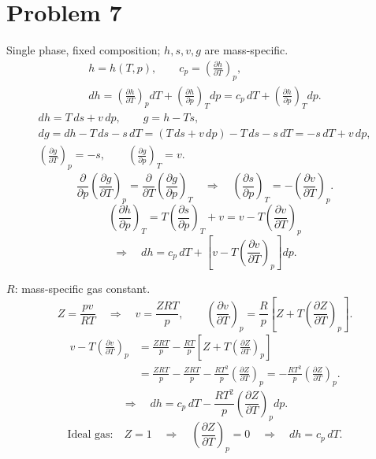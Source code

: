 \section*{Problem 7}

Single phase, fixed composition; $h,s,v,g$ are mass-specific.
\begin{gather*}
h=h(T,p),\qquad c_p=\left(\frac{\partial h}{\partial T}\right)_p,\\
dh=\left(\frac{\partial h}{\partial T}\right)_p dT
   +\left(\frac{\partial h}{\partial p}\right)_T dp
 =c_p\,dT+\left(\frac{\partial h}{\partial p}\right)_T dp.
\end{gather*}
\begin{gather*}
dh=T\,ds+v\,dp,\qquad g=h-Ts,\\
dg=dh-T\,ds-s\,dT
   =(T\,ds+v\,dp)-T\,ds-s\,dT=-s\,dT+v\,dp,\\
\left(\frac{\partial g}{\partial T}\right)_p=-s,\qquad
\left(\frac{\partial g}{\partial p}\right)_T=v.
\end{gather*}
\[
\frac{\partial}{\partial p}\left(\frac{\partial g}{\partial T}\right)_p
=\frac{\partial}{\partial T}\left(\frac{\partial g}{\partial p}\right)_T
\quad\Longrightarrow\quad
\left(\frac{\partial s}{\partial p}\right)_T
=-\left(\frac{\partial v}{\partial T}\right)_p.
\]
\[
\left(\frac{\partial h}{\partial p}\right)_T
=T\left(\frac{\partial s}{\partial p}\right)_T+v
=v-T\left(\frac{\partial v}{\partial T}\right)_p
\]
\[
\Longrightarrow\quad
\boxed{dh=c_p\,dT+
\left[v-T\left(\frac{\partial v}{\partial T}\right)_p\right]dp.}
\]

$R$: mass-specific gas constant.
\[
Z=\frac{pv}{RT}\quad\Longrightarrow\quad
v=\frac{ZRT}{p},\qquad
\left(\frac{\partial v}{\partial T}\right)_p
=\frac{R}{p}\left[Z+T\left(\frac{\partial Z}{\partial T}\right)_p\right].
\]
\begin{align*}
v-T\left(\frac{\partial v}{\partial T}\right)_p
&=\frac{ZRT}{p}-\frac{RT}{p}
  \left[Z+T\left(\frac{\partial Z}{\partial T}\right)_p\right]\\
&=\frac{ZRT}{p}-\frac{ZRT}{p}
  -\frac{RT^2}{p}\left(\frac{\partial Z}{\partial T}\right)_p
=-\frac{RT^2}{p}\left(\frac{\partial Z}{\partial T}\right)_p.
\end{align*}
\[
\Longrightarrow\quad
\boxed{dh=c_p\,dT-\frac{RT^2}{p}
\left(\frac{\partial Z}{\partial T}\right)_p dp.}
\]
\[
\text{Ideal gas:}\quad Z=1
\quad\Longrightarrow\quad
\left(\frac{\partial Z}{\partial T}\right)_p=0
\quad\Longrightarrow\quad dh=c_p\,dT.
\]

